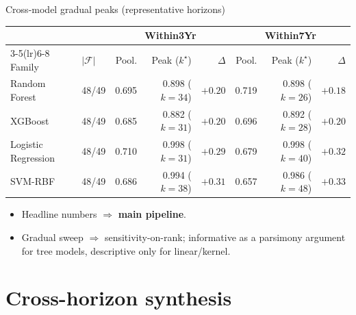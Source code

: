 \documentclass[10pt,aspectratio=169]{beamer}
\begin{document}
\begin{frame}{Cross-model gradual peaks (representative horizons)}
  \scriptsize
  \begin{center}
  \begin{tabular}{ll rrr rrr}
    \toprule
    & & \multicolumn{3}{c}{Within3Yr} & \multicolumn{3}{c}{Within7Yr} \\
    \cmidrule(lr){3-5}\cmidrule(lr){6-8}
    Family & $|\mathcal{F}|$
           & Pool. & Peak ($k^\star$) & $\Delta$
           & Pool. & Peak ($k^\star$) & $\Delta$ \\
    \midrule
    Random Forest       & 48/49 & 0.695 & 0.898 ($k\!=\!34$) & $+0.20$ & 0.719 & 0.898 ($k\!=\!26$) & $+0.18$ \\
    XGBoost             & 48/49 & 0.685 & 0.882 ($k\!=\!31$) & $+0.20$ & 0.696 & 0.892 ($k\!=\!28$) & $+0.20$ \\
    Logistic Regression & 48/49 & 0.710 & 0.998 ($k\!=\!31$) & $+0.29$ & 0.679 & 0.998 ($k\!=\!40$) & $+0.32$ \\
    SVM-RBF             & 48/49 & 0.686 & 0.994 ($k\!=\!38$) & $+0.31$ & 0.657 & 0.986 ($k\!=\!48$) & $+0.33$ \\
    \bottomrule
  \end{tabular}
  \end{center}
  \vspace{0.6em}
  \begin{itemize}
    \item Headline numbers $\Rightarrow$ \textbf{main pipeline}.
    \item Gradual sweep $\Rightarrow$ sensitivity-on-rank;
          informative as a parsimony argument for tree models, descriptive
          only for linear/kernel.
  \end{itemize}
\end{frame}

\section{Cross-horizon synthesis}
\end{document}
